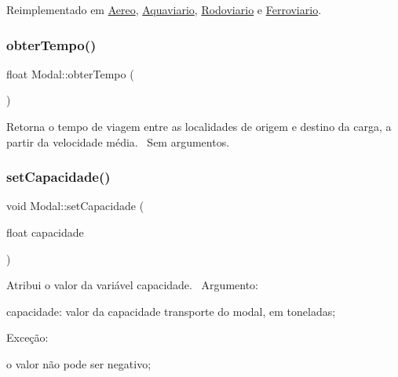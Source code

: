 Reimplementado em \hyperlink{classAereo_aebe18688abfe40893831960f4a8889d9}{Aereo}, \hyperlink{classAquaviario_a14803bda14b188a33a8f726d90171746}{Aquaviario}, \hyperlink{classRodoviario_a907ec064fb54db8a05b480cf58c5fe57}{Rodoviario} e \hyperlink{classFerroviario_a691452311fe49e6573e47220fa372d15}{Ferroviario}.

\mbox{\label{classModal_a71e2bda54694608c149ae0d72b3693a4}} 
\subsubsection{\texorpdfstring{obter\+Tempo()}{obterTempo()}}
{\footnotesize\ttfamily float Modal\+::obter\+Tempo (\begin{DoxyParamCaption}{ }\end{DoxyParamCaption})}

Retorna o tempo de viagem entre as localidades de origem e destino da carga, a partir da velocidade média.~\newline
Sem argumentos.\mbox{\label{classModal_affd03b3938af5cbe3541f82ae5ad8b6a}} 
\subsubsection{\texorpdfstring{set\+Capacidade()}{setCapacidade()}}
{\footnotesize\ttfamily void Modal\+::set\+Capacidade (\begin{DoxyParamCaption}\item[{float}]{capacidade }\end{DoxyParamCaption})}

Atribui o valor da variável capacidade.~\newline
 Argumento\+:
\begin{DoxyItemize}
\item capacidade\+: valor da capacidade transporte do modal, em toneladas;~\newline

\end{DoxyItemize}

Exceção\+:~\newline

\begin{DoxyItemize}
\item o valor não pode ser negativo;~\newline
 
\end{DoxyItemize}\mbox{\label{classModal_adae73e94a5d76a2a97329cba1fe7fb20}} 
